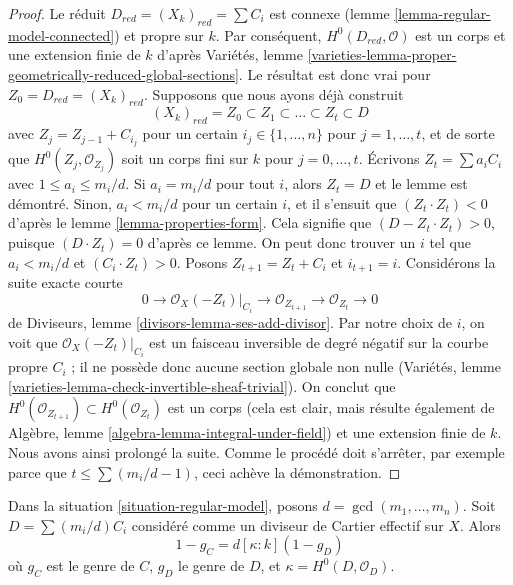 \begin{proof}
Le réduit $D_{red} = (X_k)_{red} = \sum C_i$ est connexe
(lemme \ref{lemma-regular-model-connected}) et propre sur $k$. Par conséquent,
$H^0(D_{red}, \mathcal{O})$ est un corps et une extension finie de
$k$ d'après Variétés, lemme
\ref{varieties-lemma-proper-geometrically-reduced-global-sections}.
Le résultat est donc vrai pour $Z_0 = D_{red} = (X_k)_{red}$.
Supposons que nous ayons déjà construit
$$
(X_k)_{red} = Z_0 \subset Z_1 \subset \ldots \subset Z_t \subset D
$$
avec $Z_j = Z_{j - 1} + C_{i_j}$ pour un certain $i_j \in \{1, \ldots, n\}$
pour $j = 1, \ldots, t$, et de sorte que $H^0(Z_j, \mathcal{O}_{Z_j})$
soit un corps fini sur $k$ pour $j = 0, \ldots, t$.
Écrivons $Z_t = \sum a_i C_i$ avec $1 \leq a_i \leq m_i/d$.
Si $a_i = m_i/d$ pour tout $i$, alors $Z_t = D$ et le lemme est démontré.
Sinon, $a_i < m_i/d$ pour un certain $i$, et il s'ensuit que
$(Z_t \cdot Z_t) < 0$ d'après le lemme \ref{lemma-properties-form}. Cela signifie que
$(D - Z_t \cdot Z_t) > 0$, puisque $(D \cdot Z_t) = 0$ d'après ce lemme.
On peut donc trouver un $i$ tel que $a_i < m_i/d$ et
$(C_i \cdot Z_t) > 0$. Posons $Z_{t + 1} = Z_t + C_i$ et $i_{t + 1} = i$.
Considérons la suite exacte courte
$$
0 \to \mathcal{O}_X(-Z_t)|_{C_i} \to \mathcal{O}_{Z_{t + 1}} \to
\mathcal{O}_{Z_t} \to 0
$$
de Diviseurs, lemme \ref{divisors-lemma-ses-add-divisor}.
Par notre choix de $i$, on voit que
$\mathcal{O}_X(-Z_t)|_{C_i}$ est un faisceau inversible de degré négatif
sur la courbe propre $C_i$ ; il ne possède donc aucune section globale non nulle
(Variétés, lemme \ref{varieties-lemma-check-invertible-sheaf-trivial}).
On conclut que $H^0(\mathcal{O}_{Z_{t + 1}}) \subset H^0(\mathcal{O}_{Z_t})$
est un corps (cela est clair, mais résulte également de
Algèbre, lemme \ref{algebra-lemma-integral-under-field})
et une extension finie de $k$. Nous avons ainsi prolongé la suite.
Comme le procédé doit s'arrêter, par exemple parce que $t \leq \sum (m_i/d - 1)$,
ceci achève la démonstration.
\end{proof}

\begin{lemma}
\label{lemma-regular-model-genus}
\begin{reference}
\cite[Lemma 2.6]{Artin-Winters}
\end{reference}
Dans la situation \ref{situation-regular-model}, posons $d = \gcd(m_1, \ldots, m_n)$.
Soit $D = \sum (m_i/d) C_i$ considéré comme un diviseur de Cartier effectif sur $X$. Alors
$$
1 - g_C = d [\kappa : k] (1 - g_D)
$$
où $g_C$ est le genre de $C$, $g_D$ le genre de $D$, et
$\kappa = H^0(D, \mathcal{O}_D)$.
\end{lemma}


